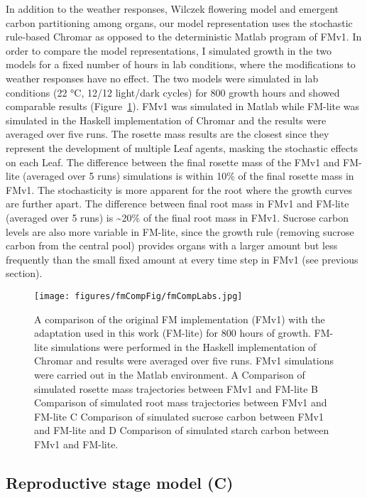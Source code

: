 In addition to the weather responses, Wilczek flowering model and emergent
carbon partitioning among organs, our model representation uses the stochastic
rule-based Chromar as opposed to the deterministic Matlab program of FMv1. In
order to compare the model representations, I simulated growth in the two
models for a fixed number of hours in lab conditions, where the modifications to
weather responses have no effect.  The two models were simulated in lab
conditions (22 °C, 12/12 light/dark cycles) for \(800\) growth hours and showed
comparable results (Figure~\ref{fig:comp}). FMv1 was simulated in Matlab while
FM-lite was simulated in the Haskell implementation of Chromar and the results
were averaged over five runs. The rosette mass results are the closest since
they represent the development of multiple Leaf agents, masking the stochastic
effects on each Leaf. The difference between the final rosette mass of the FMv1
and FM-lite (averaged over 5 runs) simulations is within 10\% of the final
rosette mass in FMv1. The stochasticity is more apparent for the root where the
growth curves are further apart. The difference between final root mass in FMv1
and FM-lite (averaged over 5 runs) is \textasciitilde{}20\% of the final root
mass in FMv1. Sucrose carbon levels are also more variable in FM-lite, since the
growth rule (removing sucrose carbon from the central pool) provides organs with
a larger amount but less frequently than the small fixed amount at every time
step in FMv1 (see previous section).

\begin{figure}[tb]
  \centering
  \texttt{[image: figures/fmCompFig/fmCompLabs.jpg]}
  \caption{A comparison of the original FM implementation (FMv1) with the
    adaptation used in this work (FM-lite) for 800 hours of growth. FM-lite
    simulations were performed in the Haskell implementation of Chromar and
    results were averaged over five runs. FMv1 simulations were carried out in
    the Matlab environment. A Comparison of simulated rosette mass trajectories
    between FMv1 and FM-lite B Comparison of simulated root mass trajectories
    between FMv1 and FM-lite C Comparison of simulated sucrose carbon between
    FMv1 and FM-lite and D Comparison of simulated starch carbon between FMv1
    and FM-lite.}
  \label{fig:comp}
\end{figure}

\subsection{Reproductive stage model (C)}
\label{reproductive-stage-model-c}


